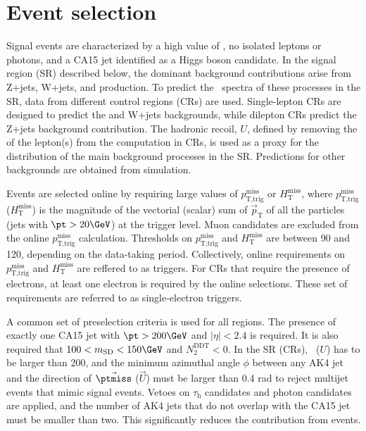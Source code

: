 \section{Event selection}


Signal events are characterized by a high value of \MET, no isolated leptons or photons, and a CA15 jet identified as a Higgs boson candidate. In the signal region (SR) described
below, the dominant background contributions arise from Z+jets,
W+jets, and \ttbar production. To predict the \ptmiss~spectra of these
processes in the SR, data from different control regions (CRs) are used. Single-lepton CRs are designed to predict the \ttbar and W+jets backgrounds, while dilepton CRs predict the Z+jets background contribution. The hadronic recoil, $U$, defined by removing the \pt of the lepton(s) from the \MET computation in CRs, is used as a proxy for the \MET distribution of the main background processes in the SR. Predictions for other backgrounds are obtained from simulation.

Events are selected online by requiring large values of $p_\text{T,trig}^\text{miss}$ or $H_{\text{T}}^{\text{miss}}$, where $p_\text{T,trig}^\text{miss}$  ($H_{\text{T}}^{\text{miss}}$) is the magnitude of the vectorial (scalar) sum of $\vec{p}_\text{T}$ of all the particles (jets with $\pt>20\GeV$) at the trigger level. Muon candidates are excluded from the online $p_\text{T,trig}^\text{miss}$ calculation.
Thresholds on $p_\text{T,trig}^\text{miss}$ and $H_{\text{T}}^{\text{miss}}$ are between 90 and 120\GeV, depending on the data-taking period. Collectively, online requirements on $p_\text{T,trig}^\text{miss}$ and $H_{\text{T}}^{\text{miss}}$ are reffered to as \MET triggers.
For CRs that require the presence of electrons, at least one electron is required by the online selections. These set of requirements are referred to as single-electron triggers.

A common set of preselection criteria is used for all regions. The presence of exactly one CA15 jet with $\pt>200\GeV$ and $|\eta|<2.4$ is required. It is also required that $100<m_{\text{SD}}<150\GeV$ and $N_2^{\text{DDT}}<0$. 
 In the SR (CRs), \ptmiss~($U$) has to be larger than 200\GeV, and the minimum azimuthal angle $\phi$ between any AK4 jet and the direction of $\vec{\ptmiss}$ ($\vec{U}$) must be larger than 0.4 rad to reject multijet events that mimic signal events. Vetoes on $\tau_\text{h}$ candidates and photon candidates are applied, and the number of AK4 jets that do not overlap with the CA15 jet must be smaller than two. This significantly reduces the contribution from \ttbar events.

